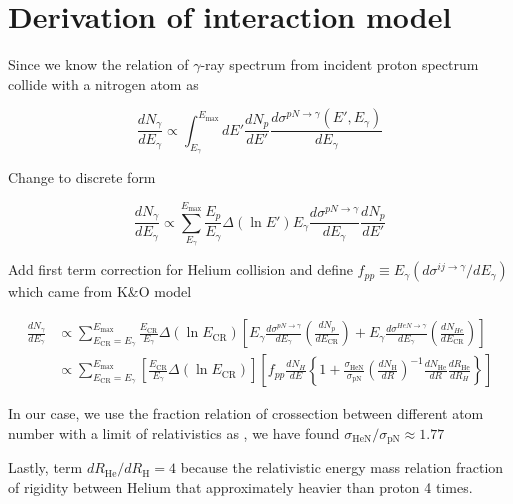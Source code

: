 \chapter{Derivation of interaction model}\label{derivationModel}

Since we know the relation of $\gamma$-ray spectrum from incident proton spectrum collide with a nitrogen atom as

\begin{equation}
    \frac{dN_\gamma}{dE_\gamma} \propto \int^{E_{\text{max}}}_{E_\gamma} dE'\frac{dN_p}{dE'} \frac{d\sigma^{pN\rightarrow\gamma}(E',E_\gamma)}{dE_\gamma}
\end{equation}

Change to discrete form

\begin{equation}
    \frac{dN_\gamma}{dE_\gamma} \propto \sum_{E_\gamma}^{E_\text{max}} \frac{E_p}{E_\gamma}\Delta(\ln E')E_\gamma\frac{d\sigma^{pN\rightarrow\gamma}}{dE_\gamma}\frac{dN_p}{dE'}
\end{equation}

Add first term correction for Helium collision and define $f_{pp}\equiv E_\gamma(d\sigma^{ij\rightarrow\gamma}/dE_\gamma)$ which came from K\&O model

\begin{equation}
\begin{split}
    \frac{dN_\gamma}{dE_\gamma} &\propto \sum_{E_\text{CR}=E_\gamma}^{E_\text{max}}\frac{E_\text{CR}}{E_\gamma}\Delta(\ln E_\text{CR})\left[ E_\gamma\frac{d\sigma^{pN\rightarrow\gamma}}{dE_\gamma}\left(\frac{dN_p}{dE_\text{CR}}\right) + E_\gamma\frac{d\sigma^{HeN\rightarrow\gamma}}{dE_\gamma}\left(\frac{dN_{He}}{dE_\text{CR}}\right) \right] \\
    &\propto \sum_{E_\text{CR}=E_\gamma}^{E_\text{max}} \left[ \frac{E_\text{CR}}{E_\gamma}\Delta(\ln E_\text{CR}) \right]\left[ f_{pp}\frac{dN_H}{dE} \left\{ 1+ \frac{\sigma_{\text{HeN}}}{\sigma_\text{pN}}\left(\frac{dN_\text{H}}{dR} \right)^{-1}\frac{dN_\text{He}}{dR}\frac{dR_\text{He}}{dR_H}\right\}\right]
\end{split}
\end{equation}

In our case, we use the fraction relation of crossection between different atom number with a limit of relativistics as \cite{WAtwater}, we have found $\sigma_{\text{HeN}}/\sigma_\text{pN} \approx 1.77$
\par Lastly, term $dR_\text{He}/dR_\text{H} = 4$ because the relativistic energy mass relation fraction of rigidity between Helium that approximately heavier than proton 4 times.
